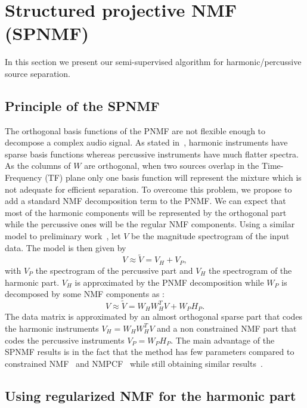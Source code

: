 \section{Structured projective NMF (SPNMF)}
\label{sec:SPNMF}

In this section we present our semi-supervised algorithm for harmonic/percussive source separation.

\subsection{Principle of the SPNMF}

The orthogonal basis functions of the PNMF are not flexible enough to decompose a complex audio signal. As stated in~\cite{canadas2014percussive}, harmonic instruments have sparse basis functions whereas percussive instruments have much flatter spectra. As the columns of $W$ are orthogonal, when two sources overlap in the Time-Frequency (TF) plane only one basis function will represent the mixture which is not adequate for efficient separation. To overcome this problem, we propose to add a standard NMF decomposition term to the PNMF. We can expect that most of the harmonic components will be represented by the orthogonal part while the percussive ones will be the regular NMF components. Using a similar model to preliminary work~\cite{laroche2015structured}, let $V$ be the magnitude spectrogram of the input data. The model is then given by
\begin{equation} \label{Cfunction}
V \approx \tilde{V}= V_H + V_{P},
\end{equation}
with $V_P$ the spectrogram of the percussive part and $V_H$ the spectrogram of the harmonic part. $V_H$ is approximated by the PNMF decomposition while $W_P$ is decomposed by some NMF components as :
\begin{equation}
V \approx \tilde{V}= W_{H}W_{H}^{T}V + W_{P} H_{P}.
\end{equation}
The data matrix is approximated by an almost orthogonal sparse part that codes the harmonic instruments $V_H = W_HW_H^T V$ and a non constrained NMF part that codes the percussive instruments $V_P = W_PH_P$. The main advantage of the SPNMF results is in the fact that the method has few parameters compared to constrained NMF~\cite{canadas2014percussive} and NMPCF~\cite{kim2011nonnegative} while still obtaining similar results~\cite{laroche2015structured}. 


\subsection{Using regularized NMF for the harmonic part}

